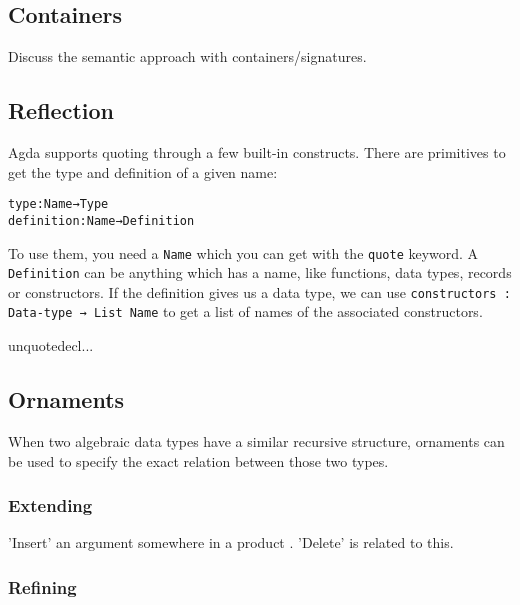 
\subsection{Containers}

Discuss the semantic approach with containers/signatures.

\subsection{Reflection}\label{sec:lit-reflection}

Agda supports quoting through a few built-in constructs.
There are primitives to get the type and definition of a given name:

\begin{alltt}
type         : Name → Type
definition   : Name → Definition
\end{alltt}

To use them, you need a \texttt{Name} which you can get with the
\texttt{quote} keyword.
A \texttt{Definition} can be anything which has a name, like
functions, data types, records or constructors.
If the definition gives us a data type, we can use 
\texttt{constructors : Data-type → List Name} to get a list of names
of the associated constructors.


unquotedecl...


\subsection{Ornaments}\label{sec:lit-ornaments}

When two algebraic data types have a similar recursive structure,
ornaments can be used to specify the exact relation between those two
types.

\subsubsection{Extending}

'Insert' an argument somewhere in a product \cite{dagand14-transporting}.
'Delete' is related to this.

\subsubsection{Refining}

